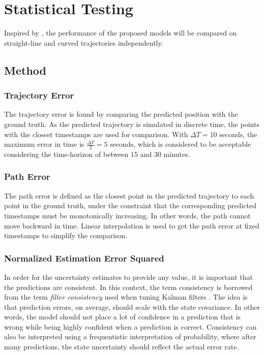 \chapter{Statistical Testing}\label{chap:stat_testing}
Inspired by \cite{hexeberg}, the performance of the proposed models will be compared on straight-line and curved trajectories independently.

\section{Method}
\subsection{Trajectory Error}
The trajectory error is found by comparing the predicted position with the ground truth. As the predicted trajectory is simulated in discrete time, the points with the closest timestamps are used for comparison. With $\Delta T = 10\text{ seconds}$, the maximum error in time is $\frac{\Delta T}{2} = 5 \text{ seconds}$, which is considered to be acceptable considering the time-horizon of between $15$ and $30$ minutes.
\subsection{Path Error}
The path error is defined as the closest point in the predicted trajectory to each point in the ground truth, under the constraint that the corresponding predicted timestamps must be monotonically increasing. In other words, the path cannot move backward in time. Linear interpolation is used to get the path error at fixed timestamps to simplify the comparison.

\subsection{Normalized Estimation Error Squared}
In order for the uncertainty estimates to provide any value, it is important that the predictions are consistent. In this context, the term consistency is borrowed from the term \textit{filter consistency} used when tuning Kalman filters \cite{sensorfusjon}. The idea is that prediction errors, on average, should scale with the state covariance. In other words, the model should not place a lot of confidence in a prediction that is wrong while being highly confident when a prediction is correct. Consistency can also be interpreted using a frequentistic interpretation of probability, where after many predictions, the state uncertainty should reflect the actual error rate.

